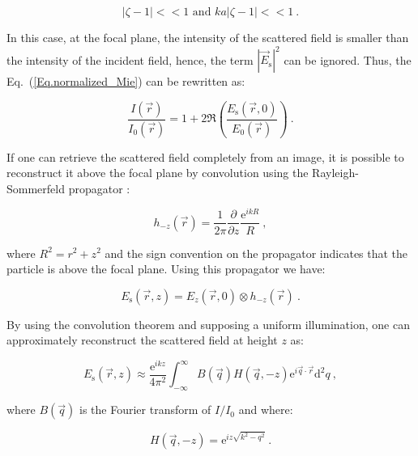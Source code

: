 \begin{equation}
	|\zeta - 1| << 1 \text{ and } ka|\zeta - 1| << 1 ~.
\end{equation}

In this case, at the focal plane, the intensity of the scattered field is smaller than the intensity of the incident field, hence, the term $|\vec{E}_\mathrm{s}|^2$ can be ignored. Thus, the Eq.~(\ref{Eq.normalized_Mie}) can be rewritten as:

\begin{equation}
	\frac{I(\vec{r})}{I_0(\vec{r})}= 1 + 2\Re \left( \frac{E_\mathrm{s}(\vec{r},0)}{E_0(\vec{r})} \right) ~.
\end{equation}

If one can retrieve the scattered field completely from an image, it is possible to reconstruct it above the focal plane by convolution using the Rayleigh-Sommerfeld propagator \cite{goodman_introduction_2005}:

\begin{equation}
	h_{-z}(\vec{r}) = \frac{1}{2 \pi} \frac{\partial}{\partial z} \frac{\mathrm{e}^{ikR}}{R} ~,
\end{equation}

where $ R^2 = r^2 + z^2 $ and the sign convention on the propagator indicates that the particle is above the focal plane. Using this propagator we have:

\begin{equation}
	E_\mathrm{s}(\vec{r}, z) = E_z(\vec{r}, 0) \otimes h_{-z}(\vec{r}) ~.
	\label{Eq:propagator}
\end{equation}

By using the convolution theorem \cite{cheong_strategies_2010, goodman_introduction_2005, sherman_application_1967,schnars_digital_1994} and supposing a uniform illumination, one can approximately reconstruct the scattered field at height $z$ as:

\begin{equation}
	E_\mathrm{s}(\vec{r}, z) \approx \frac{\mathrm{e}^{ikz}}{4\pi ^2}
	\int ^\infty _{- \infty}
	B(\vec{q}) H(\vec{q}, -z) \mathrm{e}^{i \vec{q} \cdot \vec{r}} \mathrm{d}^2 q
	\label{Eq.RS} ~,
\end{equation}

where $B(\vec{q})$ is the Fourier transform of $I/I_0$ and where:

\begin{equation}
	H(\vec{q}, -z) = \mathrm{e}^{iz \sqrt{k^2 - q^2}} ~.
\end{equation}

